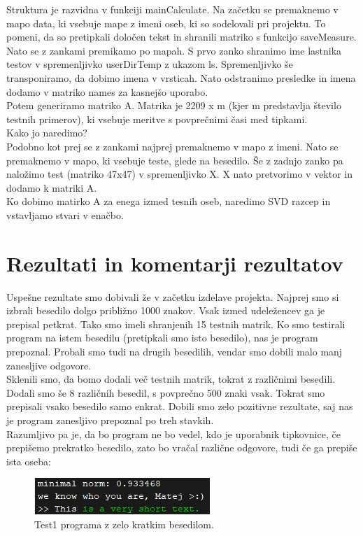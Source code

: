 \documentclass[12pt]{article}
\begin{document}
\pagebreak
Struktura je razvidna v funkciji mainCalculate. Na začetku se premaknemo v mapo data, ki vsebuje mape z imeni oseb, 
ki so sodelovali pri projektu. To pomeni, da so pretipkali določen tekst in shranili matriko s funkcijo saveMeasure.\\
\newline
Nato se z zankami premikamo po mapah. S prvo zanko shranimo ime lastnika testov v spremenljivko userDirTemp z ukazom ls. 
Spremenljivko še transponiramo, da dobimo imena v vrsticah. Nato odstranimo presledke in imena dodamo v matriko 
names za kasnejšo uporabo.\\
\newline
Potem generiramo matriko A. Matrika je 2209 x m (kjer m predstavlja število testnih primerov), ki vsebuje meritve s 
povprečnimi časi med tipkami.\\
\newline
Kako jo naredimo? \\
\newline
Podobno kot prej se z zankami najprej premaknemo v mapo z imeni. Nato se premaknemo v mapo, ki vsebuje teste, 
glede na besedilo. Še z zadnjo zanko pa naložimo test (matriko 47x47) v spremenljivko X. X nato pretvorimo v vektor 
in dodamo k matriki A. \\
\newline
Ko dobimo matirko A za enega izmed tesnih oseb, naredimo SVD razcep in vstavljamo stvari v enačbo.

\section{Rezultati in komentarji rezultatov}
Uspešne rezultate smo dobivali že v začetku izdelave projekta. Najprej smo si izbrali besedilo dolgo 
približno 1000 znakov. Vsak izmed udeležencev ga je prepisal petkrat. Tako smo imeli shranjenih 15 testnih 
matrik. Ko smo testirali program na istem besedilu (pretipkali smo isto besedilo), nas je program prepoznal. 
Probali smo tudi na drugih besedilih, vendar smo dobili malo manj zanesljive odgovore. \\
\newline
Sklenili smo, da bomo dodali več testnih matrik, tokrat z različnimi besedili. Dodali smo še 8 različnih besedil, s povprečno 500 znaki vsak. Tokrat smo prepisali vsako besedilo samo enkrat. Dobili smo zelo pozitivne rezultate, saj nas je program zanesljivo prepoznal po treh stavkih. \\
\newline
Razumljivo pa je, da bo program ne bo vedel, kdo je uporabnik tipkovnice, če prepišemo prekratko besedilo, zato bo 
vračal različne odgovore, tudi če ga prepiše ista oseba:
\begin{figure}[h]
             \centering
             \includegraphics{correct_guy}
             \caption{Test1 programa z zelo kratkim besedilom.}
\end{figure}
\end{document}
